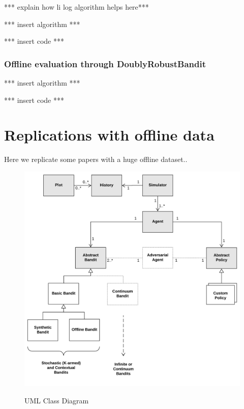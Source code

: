 \documentclass[nojss]{jss}\usepackage[]{graphicx}\usepackage[]{color}
\begin{document}
*** explain how li log algorithm helps here***

*** insert algorithm ***


*** insert code ***


\subsubsection{Offline evaluation through DoublyRobustBandit}



*** insert algorithm ***


*** insert code ***

\section{Replications with offline data}

Here we replicate some papers with a huge offline dataset..

\begin{figure}[H]
  \centering
    \includegraphics[width=.99\textwidth]{fig/contextual_class}
    \label{fig:contextual_class}
      \caption{ UML Class Diagram}
\end{figure}
\end{document}
